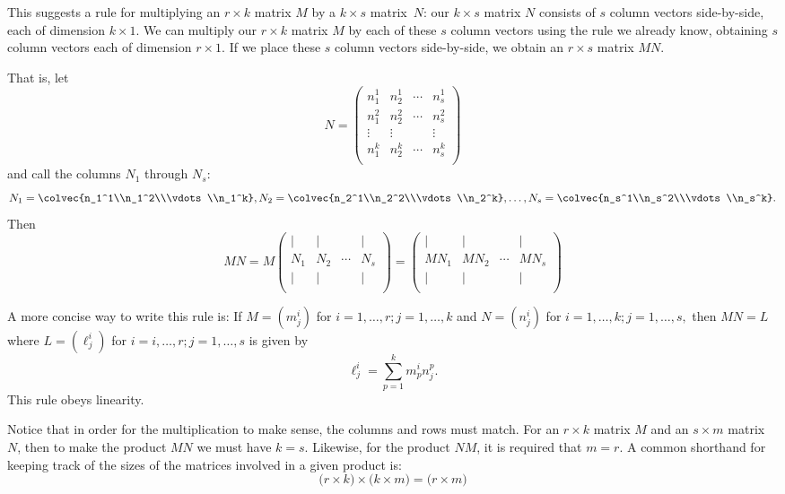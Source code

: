 This suggests a rule for multiplying an \(r \times k\) matrix \(M\) by a \(k \times s\) matrix~\(N\): our \(k \times s\) matrix \(N\) consists of \(s\) column vectors side-by-side, each of dimension \(k \times 1.\) We can multiply our \(r \times k\) matrix \(M\) by each of these \(s\) column vectors using the rule we already know, obtaining \(s\) column vectors each of dimension \(r \times 1.\) If we place these \(s\) column vectors side-by-side, we obtain an \(r \times s\) matrix \(MN.\)

That is, let \[N = 
\begin{pmatrix}
n_1^1 & n_2^1 & \cdots & n_s^1 \\
n_1^2 & n_2^2 & \cdots & n_s^2 \\
\vdots & \vdots &   & \vdots \\
n_1^k & n_2^k & \cdots & n_s^k \\
\end{pmatrix}
\]
and call the columns \(N_1\) through \(N_s\):
\[N_1 = \colvec{n_1^1\\n_1^2\\\vdots\\n_1^k},
N_2 = \colvec{n_2^1\\n_2^2\\\vdots\\n_2^k},
\ldots,
N_s = \colvec{n_s^1\\n_s^2\\\vdots\\n_s^k}.
\]
Then
\[
MN=M
\begin{pmatrix}
| & | & & | \\
N_1 & N_2 & \cdots & N_s \\
| & | & & | \\
\end{pmatrix}
=
\begin{pmatrix}
| & | & & | \\
MN_1 & MN_2 & \cdots & MN_s \\
| & | & & | \\
\end{pmatrix}
\]

A more concise way to write this rule is: If \(M=(m^i_j)\) for \(i=1, \ldots, r; j=1, \ldots, k\) and \(N=(n^i_j)\) for \(i=1, \ldots, k; j=1, \ldots, s,\) then \(MN=L\) where \(L=(\ell^i_j)\) for \(i=i, \ldots, r; j=1, \ldots, s\) is given by
\[
\ell^i_j = \sum_{p=1}^k m^i_p n^p_j.
\]
This rule obeys linearity.

Notice that in order for the multiplication to make sense, the columns and rows must match.  For an $r\times k$ matrix $M$ and an $s\times m$ matrix $N$, then to make the product $MN$ we must have $k=s$.  Likewise, for the product $NM$, it is required that $m=r$.  A common shorthand for keeping track of the sizes of the matrices involved in a given product is: 
\[\Big(r \times k\Big)\times \Big(k\times m\Big) = \Big(r\times m\Big)\]

